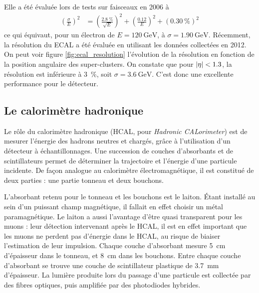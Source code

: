 Elle a été évaluée lors de tests sur faisceaux en 2006 à
\begin{align*}
  \left( \frac{\sigma}{E} \right)^2 &= \left( \frac{\SI{2.8}{\%}}{\sqrt{E}} \right)^2 + \left( \frac{\num{0.12}}{E} \right)^2 + \left(\SI{0.30}{\%}\right)^2
\end{align*}
ce qui équivaut, pour un électron de $E = \SI{120}{\GeV}$, à $\sigma = \SI{1.90}{\GeV}$. Récemment, la résolution du ECAL a été évaluée en utilisant les données collectées en 2012. On peut voir figure \ref{fig:ecal_resolution} l'évolution de la résolution en fonction de la position angulaire des super-clusters. On constate que pour $\lvert \eta \rvert < 1.3$, la résolution est inférieure à \SI{3}{\%}, soit $\sigma = \SI{3.6}{\GeV}$. C'est donc une excellente performance pour le détecteur.

\subsection{Le calorimètre hadronique} \label{sec:hcal}

Le rôle du calorimètre hadronique (HCAL, pour \emph{Hadronic CALorimeter}) est de mesurer l'énergie des hadrons neutres et chargés, grâce à l'utilisation d'un détecteur à échantillonnages. Une succession de couches d'absorbants et de scintillateurs permet de déterminer la trajectoire et l'énergie d'une particule incidente. De façon analogue au calorimètre électromagnétique, il est constitué de deux parties : une partie tonneau et deux bouchons.

L'absorbant retenu pour le tonneau et les bouchons est le laiton. Étant installé au sein d'un puissant champ magnétique, il fallait en effet choisir un métal paramagnétique. Le laiton a aussi l'avantage d'être quasi transparent pour les muons : leur détection intervenant après le HCAL, il est en effet important que les muons ne perdent pas d'énergie dans le HCAL, au risque de biaiser l'estimation de leur impulsion. Chaque couche d'absorbant mesure \SI{5}{\cm} d'épaisseur dans le tonneau, et \SI{8}{\cm} dans les bouchons. Entre chaque couche d'absorbant se trouve une couche de scintillateur plastique de \SI{3.7}{\mm} d'épaisseur. La lumière produite lors du passage d'une particule est collectée par des fibres optiques, puis amplifiée par des photodiodes hybrides.

\medskip

